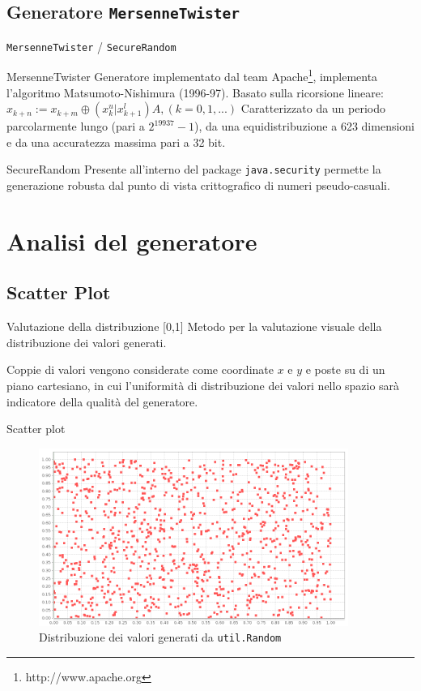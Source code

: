 \documentclass[slidestop,compress,mathserif]{beamer}
\begin{document}
\subsection{Generatore {\tt MersenneTwister}}

\begin{frame}{{\tt MersenneTwister} / {\tt SecureRandom}}
\begin{block}{MersenneTwister}
Generatore implementato dal team Apache\footnote{http://www.apache.org}, implementa l'algoritmo  Matsumoto-Nishimura (1996-97). 
Basato sulla ricorsione lineare:
$x_{k+n}:=x_{k+m} \oplus (x_{k}^{u}|x_{k+1}^{l})A, (k=0,1,...)$
Caratterizzato da un periodo parcolarmente lungo (pari a $2^{19937}-1$), da una equidistribuzione a 623 dimensioni e da una accuratezza massima pari a 32 bit.
\end{block}
\begin{block}{SecureRandom}
Presente all'interno del package {\tt java.security} permette la generazione robusta dal punto di vista crittografico di numeri pseudo-casuali.
\end{block}
\end{frame}

\section{Analisi del generatore}
\subsection{Scatter Plot}
\begin{frame}{Valutazione della distribuzione [0,1]}
\vfill
Metodo per la valutazione visuale della distribuzione dei valori generati.

Coppie di valori vengono considerate come coordinate $x$ e $y$ e poste su di un piano cartesiano, in cui l'uniformit\`a di distribuzione dei valori nello spazio sar\`a indicatore della qualit\`a del generatore.
\vfill
\end{frame}

\begin{frame}{Scatter plot}
\begin{figure}[!h]{
	\begin{center}
	   \includegraphics[width=0.9\textwidth]{figures/random.png}
	\end{center}}
	\caption{Distribuzione dei valori generati da {\tt util.Random}}
	\label{fig:random}
\end{figure}
\end{frame}
\end{document}
